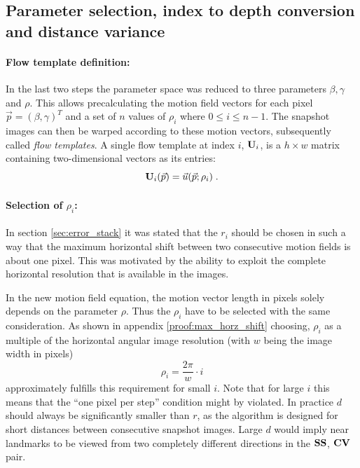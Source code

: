 \subsection{Parameter selection, index to depth conversion and distance variance}

\label{sec:index_to_depth}

\paragraph{Flow template definition:} In the last two steps the parameter space was reduced to three parameters $\beta, \gamma$ and $\rho$. This allows precalculating the motion field vectors for each pixel $\vec p = (\beta, \gamma)^T$ and a set of $n$ values of $\rho_i$ where $0 \leq i \leq n - 1$. The snapshot images can then be warped according to these motion vectors, subsequently called \textit{flow templates}. A single flow template at index $i$, $\mathbf{U}_{i}$, is a $h \times w$ matrix containing two-dimensional vectors as its entries:
\begin{equation}
  \img{U}_i(\vec p) = \vec u(\vec p; \rho_i)
  \label{eqn:flow_template_definition} \; .
\end{equation}

\paragraph{Selection of $\rho_i$:} In section \ref{sec:error_stack} it was stated that the $r_i$ should be chosen in such a way that the maximum horizontal shift between two consecutive motion fields is about one pixel. This was motivated by the ability to exploit the complete horizontal resolution that is available in the images.

In the new motion field equation, the motion vector length in pixels solely depends on the parameter $\rho$. Thus the $\rho_i$ have to be selected with the same consideration. As shown in appendix \ref{proof:max_horz_shift} choosing, $\rho_i$ as a multiple of the horizontal angular image resolution (with $w$ being the image width in pixels)
\begin{equation}
  \rho_i = \frac{2 \pi}w \cdot i
\end{equation}
approximately fulfills this requirement for small $i$. Note that for large $i$ this means that the ``one pixel per step'' condition might by violated. In practice $d$ should always be significantly smaller than $r$, as the algorithm is designed for short distances between consecutive snapshot images. Large $d$ would imply near landmarks to be viewed from two completely different directions in the $\mathbf{SS}$, $\mathbf{CV}$ pair.

